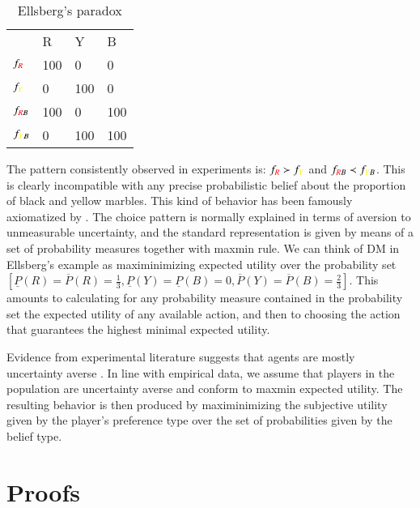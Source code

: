 \documentclass[fleqn,reqno,12pt]{article}
\theoremstyle{Satz}
\theoremstyle{Bsp}
\begin{document}


\begin{table}[h]
\centering
\begin{tabular}{@{}llll@{}}
\cmidrule(l){2-4}
\multicolumn{1}{c}{} & {\color{red}R}   & {\color{yellow}Y}   & B   \\ \cmidrule(l){2-4} 
$f_{{\color{red}R}}$              & 100 & 0   & 0   \\
$f_{{\color{yellow}Y}}$              & 0   & 100 & 0   \\
$f_{{\color{red}R}B}$            & 100 & 0   & 100 \\
$f_{{\color{yellow}Y}B}$             & 0   & 100 & 100 \\ \bottomrule
\end{tabular}
\caption{Ellsberg's paradox}
\label{Ellsberg}
\end{table}

The pattern consistently observed in experiments is:
$f_{{\color{red}R}} \succ f_{{\color{yellow}Y}}$ and
$f_{{\color{red}R}B} \prec f_{{\color{yellow}Y}B}$. This is clearly incompatible with any
precise probabilistic belief about the proportion of black and yellow marbles. This kind of
behavior has been famously axiomatized by \citet{gilsch89}. The
choice pattern is normally explained in terms of aversion to unmeasurable uncertainty, and the standard
representation is given by means of a set of probability measures together with maxmin rule. We
can think of DM in Ellsberg's example as maximinimizing expected utility over the
probability set
$
[\underline{P}(R)=\overline{P}(R)=\frac{1}{3}, \underline{P}(Y)= \underline{P}(B)=0, \overline{P}(Y)= \overline{P}(B)=\frac{2}{3}]
$.
This amounts to calculating for any probability measure contained in the probability set the
expected utility of any available action, and then to choosing the action that guarantees the
highest minimal expected utility. 

Evidence from experimental literature suggests that agents are mostly uncertainty averse \citep[e.g.,][]{TrautKuil16}. In line with empirical data, we assume that players in the population
are uncertainty averse and conform to maxmin expected utility. The resulting behavior is then
produced by maximinimizing the subjective utility given by the player's preference type over
the set of probabilities given by the belief type.

\fi

\section{Proofs}
\label{sec:proofs}
\end{document}
